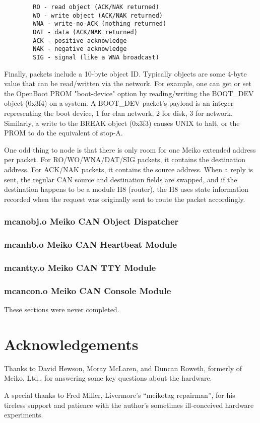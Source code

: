 \documentclass{article}
\begin{document}
\begin{verbatim}
        RO - read object (ACK/NAK returned)
        WO - write object (ACK/NAK returned)
        WNA - write-no-ACK (nothing returned)
        DAT - data (ACK/NAK returned)
        ACK - positive acknowledge
        NAK - negative acknowledge
        SIG - signal (like a WNA broadcast)
\end{verbatim}

Finally, packets include a 10-byte object ID.  Typically objects are some 
4-byte value that can be read/written via the network.  For example, one 
can get or set the OpenBoot PROM "boot-device" option by reading/writing the
BOOT\_DEV object (0x3f4) on a system.  A BOOT\_DEV packet's payload is an
integer representing the boot device, 1 for elan network, 2 for disk, 3 for
network.  Similarly, a write to the BREAK object (0x3f3) causes UNIX to halt,
or the PROM to do the equivalent of stop-A.

One odd thing to node is that there is only room for one Meiko extended 
address per packet.  For RO/WO/WNA/DAT/SIG packets, it contains the 
destination address.  For ACK/NAK packets, it contains the source address.
When a reply is sent, the regular CAN source and destination fields are
swapped, and if the destination happens to be a module H8 (router),
the H8 uses state information recorded when the request was originally sent
to route the packet accordingly.

\subsubsection{mcanobj.o Meiko CAN Object Dispatcher}
\subsubsection{mcanhb.o Meiko CAN Heartbeat Module}
\subsubsection{mcantty.o Meiko CAN TTY Module}
\subsubsection{mcancon.o Meiko CAN Console Module}

These sections were never completed.

\section{Acknowledgements}

Thanks to David Hewson, Moray McLaren, and Duncan Roweth, formerly of 
Meiko, Ltd., for answering some key questions about the hardware.

A special thanks to Fred Miller, Livermore's ``meikotag repairman'', for 
his tireless support and patience with the author's sometimes ill-conceived 
hardware experiments.



\end{document}
